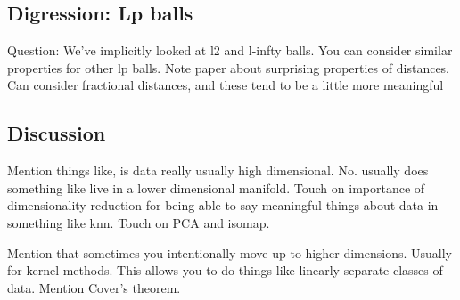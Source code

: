 \documentclass{book}
\begin{document}
\subsection{Digression: Lp balls}
Question: We've implicitly looked at l2 and l-infty balls. You can consider similar properties for other lp balls. Note paper about surprising properties of distances. Can consider fractional distances, and these tend to be a little more meaningful

\subsection{Discussion}
Mention things like, is data really usually high dimensional. No. usually does something like live in a lower dimensional manifold. Touch on importance of dimensionality reduction for being able to say meaningful things about data in something like knn. Touch on PCA and isomap. 

Mention that sometimes you intentionally move up to higher dimensions. Usually for kernel methods. This allows you to do things like linearly separate classes of data. Mention Cover's theorem. 
\end{document}
